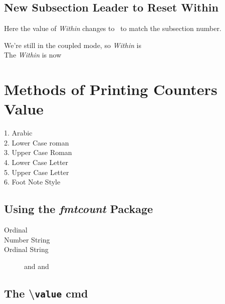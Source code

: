 \documentclass{article}
\begin{document}
	\subsection{New Subsection Leader to Reset Within}
	Here the value of \textit{Within} changes to 
	\theWithin\, to match the subsection number. 
	
	\setcounter{Within}{8} %
	\noindent
	We're still in the coupled mode, so \textit{Within} 		is \theWithin \\[5pt]
	
	The \textit{Within} is now \theWithin
	
	\section{Methods of Printing Counters Value}
	 \setcounter{seven}{7}
	\begin{description}
		\item[1. Arabic] 			
		\item[2. Lower Case roman]  
		\item[3. Upper Case Roman]  
		\item[4. Lower Case Letter] 
		\item[5. Upper Case Letter] 
		\item[6. Foot Note Style]   
	\end{description}
	
	\subsection{Using the \textit{fmtcount} Package}
	 \setcounter{four}{24}
	
	\begin{description}
		\item[Ordinal] 
		\item[Number String] 
		\item[Ordinal String]  
   		 	and  
   		 	and 
	\end{description}	
	
	\subsection{The \textbackslash \texttt{value} cmd}	
	  
	
\end{document}
